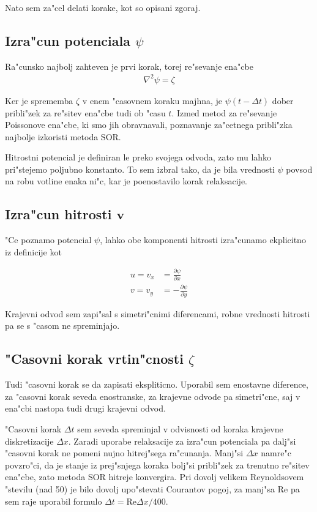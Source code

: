 \documentclass[a4paper,10pt]{article}
\renewcommand{\vec}{\mathbf}
\newcommand{\parcialno}[2]{
  \frac{\partial #1}{\partial #2}
}
\begin{document}
Nato sem za"cel delati korake, kot so opisani zgoraj. 

\subsection{Izra"cun potenciala $\psi$}

Ra"cunsko najbolj zahteven je prvi korak, torej re"sevanje ena"cbe
\begin{align}
 \nabla^2 \psi = \zeta
\end{align}

Ker je sprememba $\zeta$ v enem "casovnem koraku majhna, je $\psi(t-\Delta t)$ dober pribli"zek za re"sitev ena"cbe tudi ob "casu $t$. Izmed metod za re"sevanje Poissonove ena"cbe, ki smo jih obravnavali, poznavanje za"cetnega pribli"zka najbolje izkoristi metoda SOR. 

Hitrostni potencial je definiran le preko svojega odvoda, zato mu lahko pri"stejemo poljubno konstanto. To sem izbral tako, da je bila vrednosti $\psi$ povsod na robu votline enaka ni"c, kar je poenostavilo korak relaksacije. 

\subsection{Izra"cun hitrosti $\vec v$}

"Ce poznamo potencial $\psi$, lahko obe komponenti hitrosti izra"cunamo ekplicitno iz definicije kot

\begin{align}
 u = v_x &= \parcialno{\psi}{x} \\
 v = v_y &= -\parcialno{\psi}{y}
\end{align}

Krajevni odvod sem zapi"sal s simetri"cnimi diferencami, robne vrednosti hitrosti pa se s "casom ne spreminjajo. 

\subsection{"Casovni korak vrtin"cnosti $\zeta$}

Tudi "casovni korak se da zapisati ekspliticno. Uporabil sem enostavne diference, za "casovni korak seveda enostranske, za krajevne odvode pa simetri"cne, saj v ena"cbi nastopa tudi drugi krajevni odvod. 

"Casovni korak $\Delta t$ sem seveda spreminjal v odvisnosti od koraka krajevne diskretizacije $\Delta x$. Zaradi uporabe relaksacije za izra"cun potenciala pa dalj"si "casovni korak ne pomeni nujno hitrej"sega ra"cunanja. Manj"si $\Delta x$ namre"c povzro"ci, da je stanje iz prej"snjega koraka bolj"si pribli"zek za trenutno re"sitev ena"cbe, zato metoda SOR hitreje konvergira. Pri dovolj velikem Reynoldsovem "stevilu (nad 50) je bilo dovolj upo"stevati Courantov pogoj, za manj"sa Re pa sem raje uporabil formulo $\Delta t = \mathrm{Re}\Delta x/400$. 
\end{document}
